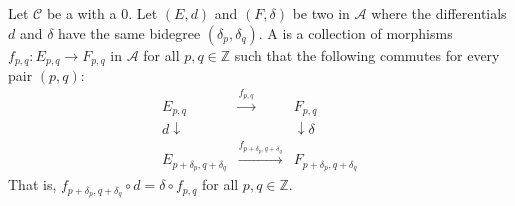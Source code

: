 \begin{definition} \label{definition:morphism_between_differential_bigraded_objects_in_a_category_with_a_zero_object}
Let $\mathcal{C}$ be a  with a  $0$. Let $(E, d)$ and $(F, \delta)$ be two  in $\mathcal{A}$ where the differentials $d$ and $\delta$ have the same bidegree $(\delta_p, \delta_q)$.
A  is a collection of morphisms $f_{p,q}: E_{p,q} \to F_{p,q}$ in $\mathcal{A}$ for all $p,q \in \mathbb{Z}$ such that the following  commutes for every pair $(p,q)$:
$$
\begin{array}{ccc}
E_{p,q} & \xrightarrow{f_{p,q}} & F_{p,q} \\
d \downarrow & & \downarrow \delta \\
E_{p+\delta_p, q+\delta_q} & \xrightarrow{f_{p+\delta_p, q+\delta_q}} & F_{p+\delta_p, q+\delta_q}
\end{array}
$$
That is, $f_{p+\delta_p, q+\delta_q} \circ d = \delta \circ f_{p,q}$ for all $p, q \in \mathbb{Z}$.
\end{definition}